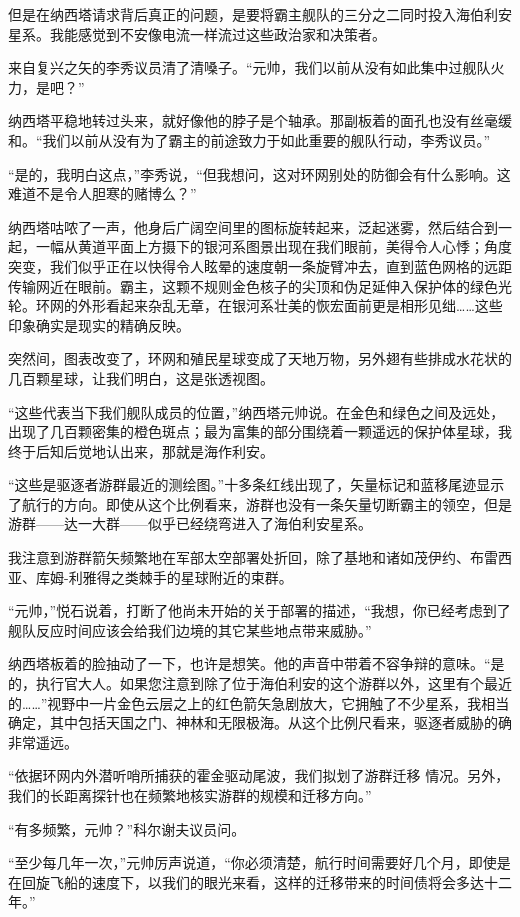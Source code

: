 \documentclass[AutoFakeBold=true]{book}
\begin{document}
但是在纳西塔请求背后真正的问题，是要将霸主舰队的{\kaishu 三分之二}同时投入海伯利安星系。我能感觉到不安像电流一样流过这些政治家和决策者。

来自复兴之矢的李秀议员清了清嗓子。``元帅，我们以前从没有如此集中过舰队火力，是吧？''

纳西塔平稳地转过头来，就好像他的脖子是个轴承。那副板着的面孔也没有丝毫缓和。``我们以前从没有为了霸主的前途致力于如此重要的舰队行动，李秀议员。''

``是的，我明白这点，''李秀说，``但我想问，这对环网别处的防御会有什么影响。这难道不是令人胆寒的赌博么？''

纳西塔咕哝了一声，他身后广阔空间里的图标旋转起来，泛起迷雾，然后结合到一起，一幅从黄道平面上方摄下的银河系图景出现在我们眼前，美得令人心悸；角度突变，我们似乎正在以快得令人眩晕的速度朝一条旋臂冲去，直到蓝色网格的远距传输网近在眼前。霸主，这颗不规则金色核子的尖顶和伪足延伸入保护体的绿色光轮。环网的外形看起来杂乱无章，在银河系壮美的恢宏面前更是相形见绌……这些印象确实是现实的精确反映。

突然间，图表改变了，环网和殖民星球变成了天地万物，另外翅有些排成水花状的几百颗星球，让我们明白，这是张透视图。

``这些代表当下我们舰队成员的位置，''纳西塔元帅说。在金色和绿色之间及远处，出现了几百颗密集的橙色斑点；最为富集的部分围绕着一颗遥远的保护体星球，我终于后知后觉地认出来，那就是海作利安。

``这些是驱逐者游群最近的测绘图。''十多条红线出现了，矢量标记和蓝移尾迹显示了航行的方向。即使从这个比例看来，游群也没有一条矢量切断霸主的领空，但是游群——达一大群——似乎已经绕弯进入了海伯利安星系。

我注意到游群箭矢频繁地在军部太空部署处折回，除了基地和诸如茂伊约、布雷西亚、库姆-利雅得之类棘手的星球附近的束群。

``元帅，''悦石说着，打断了他尚未开始的关于部署的描述，``我想，你已经考虑到了舰队反应时间应该会给我们边境的其它某些地点带来威胁。''

纳西塔板着的脸抽动了一下，也许是想笑。他的声音中带着不容争辩的意味。``是的，执行官大人。如果您注意到除了位于海伯利安的这个游群以外，这里有个最近的……''视野中一片金色云层之上的红色箭矢急剧放大，它拥触了不少星系，我相当确定，其中包括天国之门、神林和无限极海。从这个比例尺看来，驱逐者威胁的确非常遥远。

``依据环网内外潜听哨所捕获的霍金驱动尾波，我们拟划了游群迁移 情况。另外，我们的长距离探针也在频繁地核实游群的规模和迁移方向。''

``有多频繁，元帅？''科尔谢夫议员问。

``至少每几年一次，''元帅厉声说道，``你必须清楚，航行时间需要好几个月，即使是在回旋飞船的速度下，以我们的眼光来看，这样的迁移带来的时间债将会多达十二年。''
\end{document}
